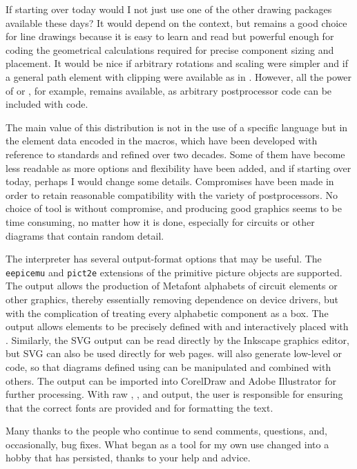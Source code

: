If starting over today would I not just use one of the other drawing
packages available these days?  It would depend on the context, but
\pic remains a good choice for line drawings because it is easy to learn
and read but powerful enough for coding the geometrical calculations
required for precise component sizing and placement. It would be nice
if arbitrary rotations and scaling were simpler and if a general path
element with clipping were available as in \Postscript.  However, all the
power of \Postscript or \TPGF, for example, remains available,
as arbitrary postprocessor code can be included with \pic code.

The main value of this distribution is not in the use of a specific
language but in the element data encoded in the macros, which have been
developed with reference to standards and refined over two decades.
Some of them have become less readable as more options and flexibility
have been added, and if starting over today, perhaps I would change
some details. Compromises have been made in order to retain reasonable
compatibility with the variety of postprocessors.  No choice of tool
is without compromise, and producing good graphics seems to be time
consuming, no matter how it is done, especially for circuits
or other diagrams that contain random detail.

The \dpic interpreter has several output-format options that may be
useful.  The {\tt eepicemu} and {\tt pict2e} extensions of the
primitive \latex picture objects are supported.  The \mfpic output
allows the production of Metafont alphabets of circuit elements or
other graphics, thereby essentially removing dependence on device
drivers, but with the complication of treating every alphabetic
component as a \tex box.  The \xfig output allows elements to be
precisely defined with \dpic  and interactively placed with \xfig.
Similarly, the SVG output can be read directly by the Inkscape graphics
editor, but SVG can also be used directly for web pages.
\Dpic will also generate low-level \MetaPost or \Postscript code, so
that diagrams defined using \pic can be manipulated and combined with
others.  The \Postscript output can be imported into
CorelDraw
and Adobe Illustrator
for further processing.
With raw \Postscript, \PDF, and \SVG output, the user is
responsible for ensuring that the correct fonts are provided and for
formatting the text.

Many thanks to the people who continue to send comments, questions,
and, occasionally, bug fixes. What began as a tool for my own use changed
into a hobby that has persisted, thanks to your help and advice.

